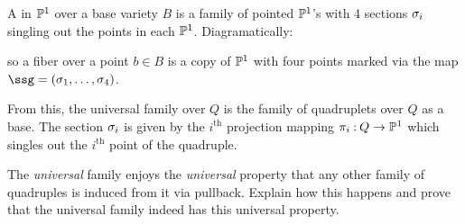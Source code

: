 \documentclass[12pt]{memoir}
\begin{document}
\begin{Def}
    A  in \(\mathbb{P}^1\) over a base variety \(B\) is a family of pointed \(\mathbb{P}^1\)'s with 4 sections \(\sigma_i\) singling out the points in each \(\mathbb{P}^1\). Diagramatically:
    \begin{center}
    \end{center}
    so a fiber over a point \(b\in B\) is a copy of \(\mathbb{P}^1\) with four points marked via the map \(\ssg=(\sg_1,\dots,\sg_4)\).
\end{Def}

From this, the universal family over \(Q\) is the family of quadruplets over \(Q\) as a base. The section \(\sigma_i\) is given by the \(i^{\text{th}}\) projection mapping \(\pi_i\mathbin{:} Q\to\mathbb{P}^1\) which singles out the \(i^{\text{th}}\) point of the quadruple.

\begin{Ej}\label{ejer-universality-of-quadruplets-no-projective-equivalence}
    The \emph{universal} family enjoys the \emph{universal} property that any other family of quadruples is induced from it via pullback. Explain how this happens and prove that the universal family indeed has this universal property.
\end{Ej}
\end{document}
